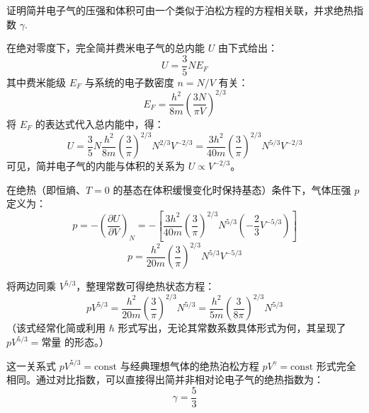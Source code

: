 \begin{exercise}\label{ex:27.5}
证明简并电子气的压强和体积可由一个类似于泊松方程的方程相关联，并求绝热指数 $\gamma$.
\end{exercise}
\begin{solution}
在绝对零度下，完全简并费米电子气的总内能 $U$ 由下式给出：
$$ U = \frac{3}{5} N E_F $$
其中费米能级 $E_F$ 与系统的电子数密度 $n = N/V$ 有关：
$$ E_F = \frac{h^2}{8m} \left( \frac{3N}{\pi V} \right)^{2/3} $$
将 $E_F$ 的表达式代入总内能中，得：
$$ U = \frac{3}{5} N \frac{h^2}{8m} \left( \frac{3}{\pi} \right)^{2/3} N^{2/3} V^{-2/3} = \frac{3h^2}{40m} \left( \frac{3}{\pi} \right)^{2/3} N^{5/3} V^{-2/3} $$
可见，简并电子气的内能与体积的关系为 $U \propto V^{-2/3}$。

在绝热（即恒熵、$T=0$ 的基态在体积缓慢变化时保持基态）条件下，气体压强 $p$ 定义为：
$$ p = - \left( \frac{\partial U}{\partial V} \right)_N = - \left[ \frac{3h^2}{40m} \left( \frac{3}{\pi} \right)^{2/3} N^{5/3} \left( - \frac{2}{3} V^{-5/3} \right) \right] $$
$$ p = \frac{h^2}{20m} \left( \frac{3}{\pi} \right)^{2/3} N^{5/3} V^{-5/3} $$

将两边同乘 $V^{5/3}$，整理常数可得绝热状态方程：
$$ p V^{5/3} = \frac{h^2}{20m} \left( \frac{3}{\pi} \right)^{2/3} N^{5/3} = \frac{h^2}{5m} \left( \frac{3}{8\pi} \right)^{2/3} N^{5/3} $$
（该式经常化简或利用 $\hbar$ 形式写出，无论其常数系数具体形式为何，其呈现了 $p V^{5/3} = \text{常量}$ 的形态。）

这一关系式 $p V^{5/3} = \mathrm{const}$ 与经典理想气体的绝热泊松方程 $p V^\gamma = \mathrm{const}$ 形式完全相同。通过对比指数，可以直接得出简并非相对论电子气的绝热指数为：
$$ \gamma = \frac{5}{3} $$
\end{solution}

